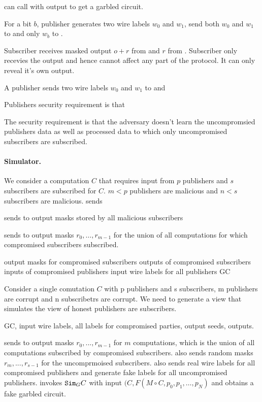 \Sim 


\Sim can call \F with output to get a garbled circuit.

For a bit $b$, publisher generates two wire labels $w_0$ and $w_1$, send both
$w_0$ and $w_1$ to \garbler and only $w_b$ to \broker.

Subscriber receives masked output $o+r$ from \broker and $r$ from \garbler.
Subscriber only recevies the output and hence cannot affect any part of the
protocol. It can only reveal it's own output.

A publisher sends two wire labels $w_0$ and $w_1$ to \garbler and 




Publishers security requirement is that 

The security requirement is that the adversary doesn't learn the uncompromsied
publishers data as well as processed data to which only uncompromised
subscribers are subscribed.

\paragraph{Simulator.}
We consider a computation $C$ that requires input from $p$ publishers and $s$
subscribers are subscribed for $C$. $m < p$ publishers are malicious and $n <
s$ subscribers are malicious. \Sim sends \Adv 


\Sim sends to \Adv output masks stored by all malicious subscribers


\Sim sends to \Adv output masks $r_0, \ldots, r_{m-1}$ for the union of all
computations for which compromised subscribers subscribed. \Sim 

output masks for compromised subscribers
outputs of compromised subscribers
inputs of compromised publishers
input wire labels for all publishers
GC



Consider a single comutation $C$ with p publishers and s subscribers, m
publishers are corrupt and n subscribetrs are corrupt. We need to generate a
view that simulates the view of honest publishers are subscribers.




GC, input wire labels, all labels for compromised parties, output seeds,
outputs.

\Sim sends to \Adv output masks $r_0,...,r_{m-1}$ for $m$ computations, which
is the union of all computations subscribed by compromised subscribers. \Sim
also sends random masks $r_m,...,r_{s-1}$ for the uncomprmoised subscribers.
\Sim also sends real wire labels for all compromised publishers and generate
fake labels for all uncompromised publishers. \Sim invokes $\texttt{Sim}_GC$ with input
$(C, F(M \circ C, p_0, p_1, \ldots, p_N)$ and obtains a fake garbled circuit. 

